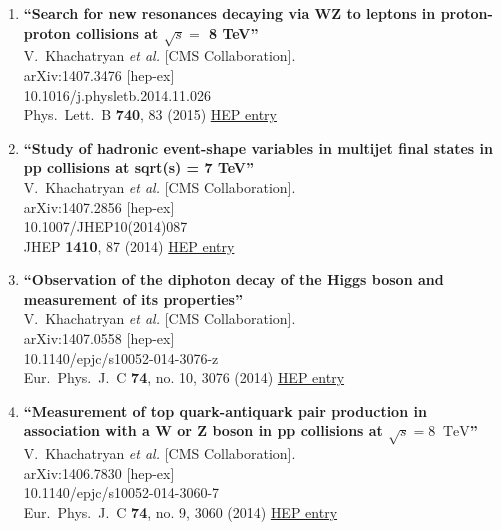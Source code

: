\documentclass{article}
\begin{document}
\begin{enumerate}
\item%
{\bf ``Search for new resonances decaying via WZ to leptons in proton-proton collisions at $\sqrt s =$ 8 TeV''}
  \\{}V.~Khachatryan {\it et al.} [CMS Collaboration].
  \\{}arXiv:1407.3476 [hep-ex]
    \\{}10.1016/j.physletb.2014.11.026
\\{}Phys.\ Lett.\ B {\bf 740}, 83 (2015) %
\href{http://inspirehep.net/record/1306289}{HEP entry}


\item%
{\bf ``Study of hadronic event-shape variables in multijet final states in pp collisions at sqrt(s) = 7 TeV''}
  \\{}V.~Khachatryan {\it et al.} [CMS Collaboration].
  \\{}arXiv:1407.2856 [hep-ex]
    \\{}10.1007/JHEP10(2014)087
\\{}JHEP {\bf 1410}, 87 (2014) %
\href{http://inspirehep.net/record/1305624}{HEP entry}


\item%
{\bf ``Observation of the diphoton decay of the Higgs boson and measurement of its properties''}
  \\{}V.~Khachatryan {\it et al.} [CMS Collaboration].
  \\{}arXiv:1407.0558 [hep-ex]
    \\{}10.1140/epjc/s10052-014-3076-z
\\{}Eur.\ Phys.\ J.\ C {\bf 74}, no. 10, 3076 (2014) %
\href{http://inspirehep.net/record/1304454}{HEP entry}


\item%
{\bf ``Measurement of top quark-antiquark pair production in association with a W or Z boson in pp collisions at $\sqrt{s} = 8$ $\,\text {TeV}$''}
  \\{}V.~Khachatryan {\it et al.} [CMS Collaboration].
  \\{}arXiv:1406.7830 [hep-ex]
    \\{}10.1140/epjc/s10052-014-3060-7
\\{}Eur.\ Phys.\ J.\ C {\bf 74}, no. 9, 3060 (2014) %
\href{http://inspirehep.net/record/1303904}{HEP entry}



\end{enumerate}
\end{document}
